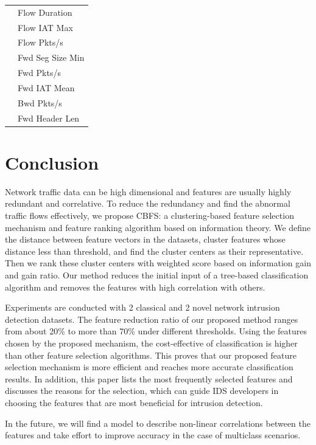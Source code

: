 \documentclass{ieeeaccess}
\theoremstyle{definition}
\begin{document}
\begin{table}[htbp]
\begin{tabular}{ll}
            & Flow Duration \\
            & Flow IAT Max \\
            & Flow Pkts/s \\
            & Fwd Seg Size Min \\
            & Fwd Pkts/s \\
            & Fwd IAT Mean \\
            & Bwd Pkts/s \\
            & Fwd Header Len \\
        \bottomrule
        \end{tabular}%
    \label{tab:selected-features}%
\end{table}%


\section{Conclusion}
\label{sec:conclusion}

Network traffic data can be high dimensional and features are usually highly redundant and correlative. To reduce the redundancy and find the abnormal traffic flows effectively, we propose CBFS: a clustering-based feature selection mechanism and feature ranking algorithm based on information theory. We define the distance between feature vectors in the datasets, cluster features whose distance less than threshold, and find the cluster centers as their representative. Then we rank these cluster centers with weighted score based on information gain and gain ratio. Our method reduces the initial input of a tree-based classification algorithm and removes the features with high correlation with others. 

Experiments are conducted with 2 classical and 2 novel network intrusion detection datasets. The feature reduction ratio of our proposed method ranges from about 20\% to more than 70\% under different thresholds. Using the features chosen by the proposed mechanism, the cost-effective of classification is higher than other feature selection algorithms. This proves that our proposed feature selection mechanism is more efficient and reaches more accurate classification results. In addition, this paper lists the most frequently selected features and discusses the reasons for the selection, which can guide IDS developers in choosing the features that are most beneficial for intrusion detection.

In the future, we will find a model to describe non-linear correlations between the features and take effort to improve accuracy in the case of multiclass scenarios. 
\end{document}
